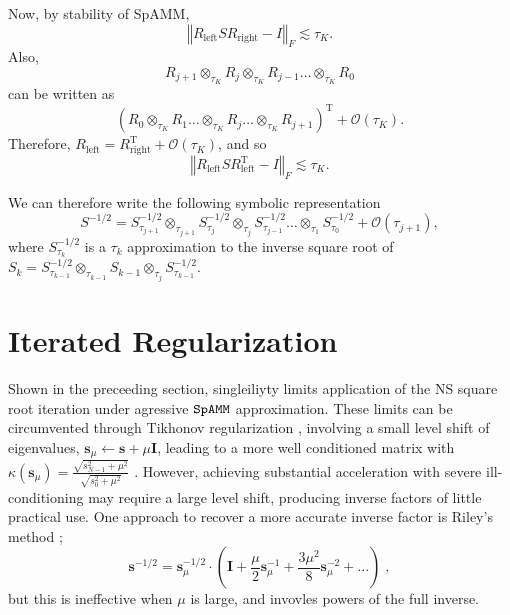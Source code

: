 \documentclass[letterpaper,twocolumn,amsmath,amsfont,amssymb,english,aps,jcp,preprintnumbers,groupaddress,nofootinbib,tightenlines,floatfix]{revtex4}
\newcommand{\mat}[1]{\boldsymbol{#1}}
\theoremstyle{plain}
\theoremstyle{remark}
\theoremstyle{plain}
\begin{document}
Now, by stability of SpAMM,
\[
\left\Vert R_{\text{left}}SR_{\text{right}}-I\right\Vert _{F}\lesssim\tau_{K}.
\]
Also,
\[
R_{j+1}\otimes_{\tau_{K}}R_{j}\otimes_{\tau_{K}}R_{j-1}\dots\otimes_{\tau_{K}}R_{0} 
\]
can be written as
\[ 
 \left(R_{0}\otimes_{\tau_{K}}R_{1}\dots\otimes_{\tau_{K}}R_{j}\dots\otimes_{\tau_{K}}R_{j+1}\right)^{\text{T}}+\mathcal{O}\left(\tau_{K}\right).
\]
Therefore, $R_{\text{left}}=R_{\text{right}}^{\text{T}}+\mathcal{O}\left(\tau_{K}\right)$,
and so 
\begin{equation}
\left\Vert R_{\text{left}}SR_{\text{left}}^{\text{T}}-I\right\Vert _{F}\lesssim\tau_{K}.\label{eq:product decomposition error bound}
\end{equation}


We can therefore write the following symbolic representation 
\[
S^{-1/2}=S_{\tau_{j+1}}^{-1/2}\otimes_{\tau_{j+1}}S_{\tau_{j}}^{-1/2}\otimes_{\tau_{j}}S_{\tau_{j-1}}^{-1/2}\dots\otimes_{\tau_{1}}S_{\tau_{0}}^{-1/2}+\mathcal{O}\left(\tau_{j+1}\right),
\]
where $S_{\tau_{k}}^{-1/2}$ is a $\tau_{k}$ approximation to the
inverse square root of $S_{k}=S_{\tau_{k-1}}^{-1/2}\otimes_{\tau_{k-1}}S_{k-1}\otimes_{\tau_{j}}S_{\tau_{k-1}}^{-1/2}$. 


\section{Iterated Regularization}\label{regularization}

Shown in the preceeding section, singleiliyty limits application of the NS square root iteration under 
agressive $\tt SpAMM$ approximation.  These limits can be circumvented through Tikhonov regularization \cite{}, 
involving a small level shift of eigenvalues,  $\mat{s}_\mu \leftarrow \mat{s}+\mu \mat{I}$, leading to a more 
well conditioned matrix with $\kappa( \mat{s}_\mu) = \frac{\sqrt{s^2_{N-1} + \mu^2}}{\sqrt{s^2_0+\mu^2}}$ \cite{}.  
However, achieving substantial acceleration with severe ill-conditioning  may require a large level shift, 
producing inverse factors of little practical use.  One approach to recover a more accurate inverse
factor is Riley's method \cite{}; 
\begin{equation}
\mat{s}^{-1/2} = \mat{s}^{-1/2}_{\mu} \cdot \left( \mat{I}+\frac{\mu}{2} \mat{s}^{-1}_{\mu}
                                                   +\frac{3 \mu^2}{8} \mat{s}^{-2}_{\mu} + \dots
   \right) \; ,
\end{equation}
but this is ineffective when $\mu$ is large, and invovles powers of the full inverse. 
\end{document}
